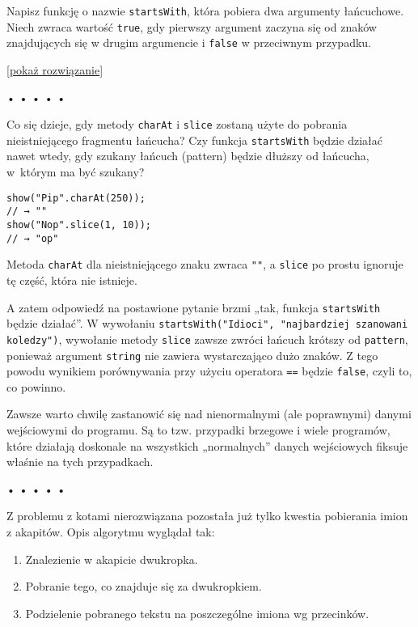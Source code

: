       
Napisz funkcję o nazwie \texttt{startsWith}, która pobiera dwa argumenty łańcuchowe. Niech zwraca wartość \texttt{true}, gdy pierwszy argument zaczyna się od znaków znajdujących się w drugim argumencie i \texttt{false} w przeciwnym przypadku.

    
[\hyperref[sol:4.4]{pokaż rozwiązanie}]
    
    
  
  
\begin{center}
• • • • •
\end{center}
  
    
Co się dzieje, gdy metody \texttt{charAt} i \texttt{slice} zostaną użyte do pobrania nieistniejącego fragmentu łańcucha? Czy funkcja \texttt{startsWith} będzie działać nawet wtedy, gdy szukany łańcuch (pattern) będzie dłuższy od łańcucha, w~którym ma być szukany?

    
\begin{verbatim} 
show("Pip".charAt(250));
// → ""
show("Nop".slice(1, 10));
// → "op"
 \end{verbatim}
    
Metoda \texttt{charAt} dla nieistniejącego znaku zwraca \texttt{""}, a \texttt{slice} po prostu ignoruje tę część, która nie istnieje.

    
A zatem odpowiedź na postawione pytanie brzmi „tak, funkcja \texttt{startsWith} będzie działać”. W wywołaniu \texttt{startsWith("Idioci", "najbardziej szanowani koledzy")}, wywołanie metody \texttt{slice} zawsze zwróci łańcuch krótszy od \texttt{pattern}, ponieważ argument \texttt{string} nie zawiera wystarczająco dużo znaków. Z tego powodu wynikiem porównywania przy użyciu operatora \texttt{==} będzie \texttt{false}, czyli to, co powinno.

    
Zawsze warto chwilę zastanowić się nad nienormalnymi (ale poprawnymi) danymi wejściowymi do programu. Są to tzw. przypadki brzegowe i wiele programów, które działają doskonale na wszystkich „normalnych” danych wejściowych fiksuje właśnie na tych przypadkach.

  
  
\begin{center}
• • • • •
\end{center}
  
    
Z problemu z kotami nierozwiązana pozostała już tylko kwestia pobierania imion z akapitów. Opis algorytmu wyglądał tak:

    \begin{enumerate}
      \item Znalezienie w akapicie dwukropka.
      \item Pobranie tego, co znajduje się za dwukropkiem.
      \item Podzielenie pobranego tekstu na poszczególne imiona wg przecinków.
    \end{enumerate}
    
